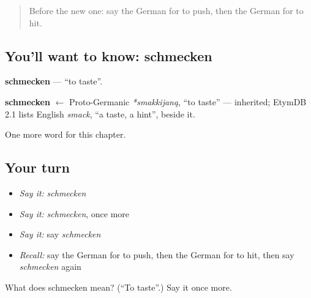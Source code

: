 \begin{quote}
Before the new one: say the German for to push, then the German for to hit.
\end{quote}

\subsection*{You'll want to know: schmecken}
\textbf{schmecken} — \textquotedblleft{}to taste\textquotedblright{}.

\begin{cousinweb}
\textbf{schmecken} $\leftarrow$ Proto-Germanic \emph{*smakkijaną}, \textquotedblleft{}to taste\textquotedblright{} — inherited; EtymDB 2.1 lists English \emph{smack}, \textquotedblleft{}a taste, a hint\textquotedblright{}, beside it.
\end{cousinweb}

\begin{grammarlens}[title={What you've built}]
One more word for this chapter.
\end{grammarlens}

\subsection*{Your turn}
\begin{itemize}
\raggedright
  \item \emph{Say it:} \emph{schmecken}
  \item \emph{Say it:} \emph{schmecken}, once more
  \item \emph{Say it:} say \emph{schmecken}
  \item \emph{Recall:} say the German for to push, then the German for to hit, then say \emph{schmecken} again
\end{itemize}

\begin{tcolorbox}[breakable,colback=teal!4,colframe=teal!35!black,title={Before you move on}]
What does schmecken mean? (\textquotedblleft{}To taste\textquotedblright{}.) Say it once more.
\end{tcolorbox}
